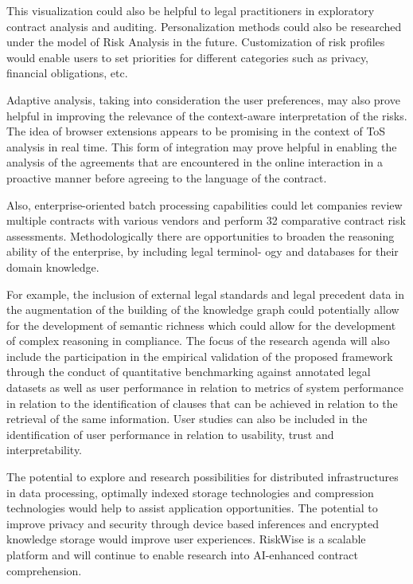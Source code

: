 This visualization could also be helpful to legal practitioners in exploratory contract analysis and auditing.
Personalization methods could also be researched under the model of Risk Analysis in the future.
Customization of risk profiles would enable users to set priorities for different categories such as
privacy, financial obligations, etc.

Adaptive analysis, taking into consideration the user preferences, may also prove helpful in improving the relevance of the context-aware interpretation of the risks.
The idea of browser extensions appears to be promising in the context of ToS analysis in real time.
This form of integration may prove helpful in enabling the analysis of the agreements that are encountered in the online interaction in a proactive manner before agreeing to the language of the contract.

Also, enterprise-oriented batch processing capabilities could let companies review multiple contracts with
various vendors and perform 32 comparative contract risk assessments.
Methodologically there are opportunities to broaden the reasoning ability of the enterprise, by including legal
terminol- ogy and databases for their domain knowledge.

For example, the inclusion of external legal standards and legal precedent data in the augmentation of the building of the knowledge graph could potentially allow for the development of semantic richness which could allow for the development of complex reasoning in compliance.
The focus of the research agenda will also include the participation in the empirical validation of the proposed framework through the conduct of quantitative benchmarking against annotated legal datasets as well as user performance in relation to metrics of system performance in relation to the identification of clauses that can be achieved in relation to the retrieval of the same information.
User studies can also be included in the identification of user performance in relation to usability, trust and interpretability.

The potential to explore and research possibilities for distributed infrastructures in data processing, optimally indexed storage technologies and compression technologies would help to assist application opportunities.
The potential to improve privacy and security through device based inferences and encrypted knowledge storage would improve user experiences.
RiskWise is a scalable platform and will continue to enable research into AI-enhanced contract comprehension.

